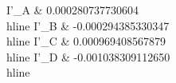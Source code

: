I'_A & 0.000280737730604\\ hline
I'_B & -0.000294385330347\\ hline
I'_C & 0.000969408567879\\ hline
I'_D & -0.001038309112650\\ hline
